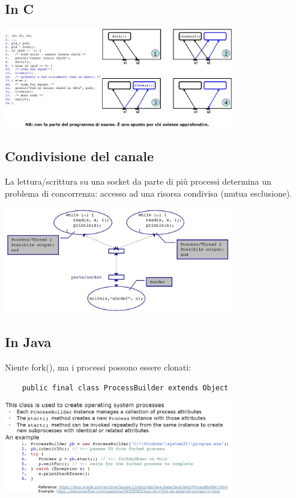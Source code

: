 \subsection{In C}
\begin{center}
    \includegraphics[width=0.75\textwidth]{img/serverMultiprocesso_C1.jpg}
\end{center}

\subsection{Condivisione del canale}
La lettura/scrittura su una socket da parte di più processi determina un problema di concorrenza: accesso ad una risorsa condivisa (mutua esclusione).
\begin{center}
    \includegraphics[width=0.75\textwidth]{img/serverMultiprocesso2.jpg}
\end{center}

\subsection{In Java}
Niente fork(), ma i processi possono essere clonati:
\begin{verbatim}
    public final class ProcessBuilder extends Object
\end{verbatim}
\begin{center}
    \includegraphics[width=0.75\textwidth]{img/serverMultiprocesso_Java1.jpg}
\end{center}

